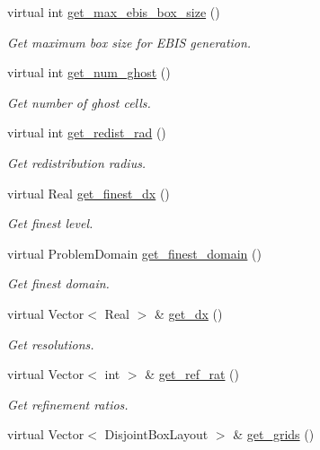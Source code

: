 \begin{DoxyCompactItemize}
virtual int \hyperlink{classamr__mesh_ac96380589109d64f2c4cb630f944f394}{get\+\_\+max\+\_\+ebis\+\_\+box\+\_\+size} ()
\begin{DoxyCompactList}\small\item\em Get maximum box size for E\+B\+IS generation. \end{DoxyCompactList}\item 
virtual int \hyperlink{classamr__mesh_a5cbce6adfe6977df51dbf71fd12506fd}{get\+\_\+num\+\_\+ghost} ()
\begin{DoxyCompactList}\small\item\em Get number of ghost cells. \end{DoxyCompactList}\item 
virtual int \hyperlink{classamr__mesh_a36958a43b8dea218a130dae4532ba066}{get\+\_\+redist\+\_\+rad} ()
\begin{DoxyCompactList}\small\item\em Get redistribution radius. \end{DoxyCompactList}\item 
virtual Real \hyperlink{classamr__mesh_abea8d3b5a5b041359892920315a43937}{get\+\_\+finest\+\_\+dx} ()
\begin{DoxyCompactList}\small\item\em Get finest level. \end{DoxyCompactList}\item 
virtual Problem\+Domain \hyperlink{classamr__mesh_a5e520c735dc80224293ac78639a880b2}{get\+\_\+finest\+\_\+domain} ()
\begin{DoxyCompactList}\small\item\em Get finest domain. \end{DoxyCompactList}\item 
virtual Vector$<$ Real $>$ \& \hyperlink{classamr__mesh_a620d7dccd82cd03ae7e0ac4ce2fdb71c}{get\+\_\+dx} ()
\begin{DoxyCompactList}\small\item\em Get resolutions. \end{DoxyCompactList}\item 
virtual Vector$<$ int $>$ \& \hyperlink{classamr__mesh_af15cfbab06ef553ec9f9dd1cc193a267}{get\+\_\+ref\+\_\+rat} ()
\begin{DoxyCompactList}\small\item\em Get refinement ratios. \end{DoxyCompactList}\item 
virtual Vector$<$ Disjoint\+Box\+Layout $>$ \& \hyperlink{classamr__mesh_a87f83b55bac2864cc5101f1c46083812}{get\+\_\+grids} ()

\end{DoxyCompactItemize}
